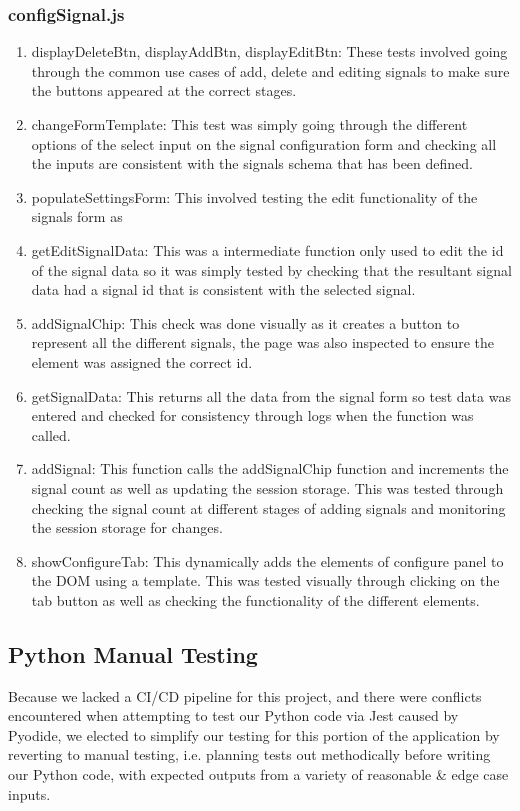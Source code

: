 \subsubsection{configSignal.js}
\begin{enumerate}
\item displayDeleteBtn, displayAddBtn, displayEditBtn: These tests involved going through the common use cases of add, delete and editing signals to make sure the buttons appeared at the correct stages.
\item changeFormTemplate: This test was simply going through the different options of the select input on the signal configuration form and checking all the inputs are consistent with the signals schema that has been defined.
\item populateSettingsForm: This involved testing the edit functionality of the signals form as 
\item getEditSignalData: This was a intermediate function only used to edit the id of the signal data so it was simply tested by checking that the resultant signal data had a signal id that is consistent with the selected signal.
\item addSignalChip: This check was done visually as it creates a button to represent all the different signals, the page was also inspected to ensure the element was assigned the correct id.
\item getSignalData: This returns all the data from the signal form so test data was entered and checked for consistency through logs when the function was called.
\item addSignal: This function calls the addSignalChip function and increments the signal count as well as updating the session storage. This was tested through checking the signal count at different stages of adding signals and monitoring the session storage for changes.
\item showConfigureTab: This dynamically adds the elements of configure panel to the DOM using a template. This was tested visually through clicking on the tab button as well as checking the functionality of the different elements.
\end{enumerate}

\subsection{Python Manual Testing}
Because we lacked a CI/CD pipeline for this project, and there were conflicts encountered when attempting to test our Python code via Jest caused by Pyodide, we elected to simplify our testing for this portion of the application by reverting to manual testing, i.e. planning tests out methodically before writing our Python code, with expected outputs from a variety of reasonable \& edge case inputs. 

